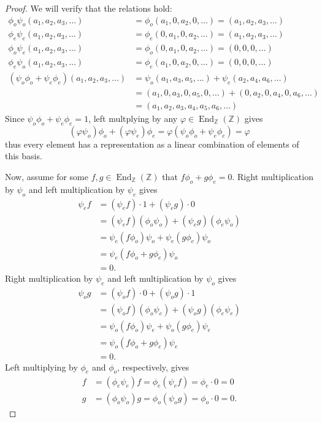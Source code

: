 \documentclass[10pt]{article}
\newcommand{\Z}{\mathbb{Z}}
\DeclareMathOperator*{\End}{End}
\begin{document}
\begin{enumerate}
\begin{proof}
We will verify that the relations hold:
\begin{align*}
\phi_o \psi_o(a_1,a_2,a_3,\ldots) &= \phi_o (a_1,0,a_2,0,\ldots) = (a_1, a_2, a_3, \ldots)
\\
\phi_e \psi_e(a_1,a_2,a_3,\ldots) &= \phi_e (0,a_1,0,a_2,\ldots) = (a_1, a_2, a_3, \ldots)
\\
\phi_o \psi_e(a_1,a_2,a_3,\ldots) &= \phi_o (0,a_1,0,a_2,\ldots) = (0,0,0, \ldots)
\\
\phi_e \psi_o(a_1,a_2,a_3,\ldots) &= \phi_e (a_1,0,a_2,0,\ldots) = (0,0,0, \ldots)
\\
(\psi_o\phi_o + \psi_e \phi_e)(a_1,a_2,a_3,\ldots) &= \psi_o(a_1,a_3,a_5,\ldots) + \psi_e(a_2,a_4,a_6,\ldots)
\\
&= (a_1, 0 , a_3, 0 ,a_5, 0 , \ldots) + (0,a_2,0,a_4,0,a_6,\ldots)
\\
&= (a_1,a_2,a_3,a_4,a_5,a_6,\ldots)
\end{align*}
Since $\psi_o \phi_o + \psi_e \phi_e = 1$, left multplying by any $\varphi \in \End_\Z (\Z)$ gives
$$
(\varphi\psi_o) \phi_o + (\varphi\psi_e) \phi_e = \varphi(\psi_o \phi_o + \psi_e \phi_e) = \varphi
$$
thus every element has a representation as a linear combination of elements of this basis.

Now, assume for some $f,g \in \End_\Z(\Z)$ that $f\phi_o + g \phi_e = 0$.  Right multiplication by $\psi_o$ and left multiplication by $\psi_e$ gives
\begin{align*}
\psi_e f
&= (\psi_e f) \cdot 1 + (\psi_e g) \cdot 0
\\
&= (\psi_e f) (\phi_o\psi_o) + (\psi_e g) (\phi_e\psi_o)
\\
&= \psi_e (f\phi_o) \psi_o + \psi_e (g \phi_e)\psi_o
\\
&= \psi_e (f\phi_o + g \phi_e) \psi_o
\\
&= 0.
\end{align*}
Right multiplication by $\psi_e$ and left multiplication by $\psi_o$ gives
\begin{align*}
\psi_o g
&= (\psi_o f) \cdot 0 + (\psi_o g) \cdot 1
\\
&= (\psi_o f) (\phi_o\psi_e) + (\psi_o g) (\phi_e\psi_e)
\\
&= \psi_o (f\phi_o) \psi_e + \psi_o (g \phi_e)\psi_e
\\
&= \psi_o (f\phi_o + g \phi_e) \psi_e
\\
&= 0.
\end{align*}
Left multiplying by $\phi_e$ and $\phi_o$, respectively, gives
\begin{align*}
f &= (\phi_e \psi_e) f = \phi_e (\psi_e f) = \phi_e \cdot 0 = 0
\\
g &= (\phi_o \psi_o) g = \phi_o (\psi_o g) = \phi_o \cdot 0 = 0.
\end{align*}


\end{proof}
\end{enumerate}
\end{document}
